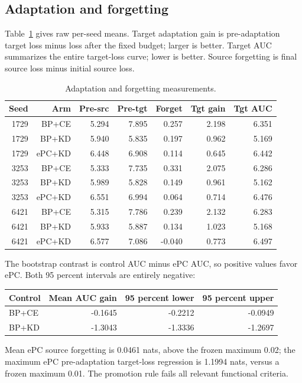 \documentclass[11pt]{article}
\begin{document}
\subsection{Adaptation and forgetting}
Table~\ref{tab:adapt} gives raw per-seed means. Target adaptation gain is pre-adaptation target loss minus loss after the fixed budget; larger is better. Target AUC summarizes the entire target-loss curve; lower is better. Source forgetting is final source loss minus initial source loss.
\begin{table}[ht]
\centering
\small
\caption{Adaptation and forgetting measurements.}
\label{tab:adapt}
\begin{tabular}{rrrrrrr}
\toprule
Seed & Arm & Pre-src & Pre-tgt & Forget & Tgt gain & Tgt AUC \\
\midrule
1729 & BP+CE  & 5.294 & 7.895 & 0.257 & 2.198 & 6.351 \\
1729 & BP+KD  & 5.940 & 5.835 & 0.197 & 0.962 & 5.169 \\
1729 & ePC+KD & 6.448 & 6.908 & 0.114 & 0.645 & 6.442 \\
3253 & BP+CE  & 5.333 & 7.735 & 0.331 & 2.075 & 6.286 \\
3253 & BP+KD  & 5.989 & 5.828 & 0.149 & 0.961 & 5.162 \\
3253 & ePC+KD & 6.551 & 6.994 & 0.064 & 0.714 & 6.476 \\
6421 & BP+CE  & 5.315 & 7.786 & 0.239 & 2.132 & 6.283 \\
6421 & BP+KD  & 5.933 & 5.887 & 0.134 & 1.023 & 5.168 \\
6421 & ePC+KD & 6.577 & 7.086 & -0.040 & 0.773 & 6.497 \\
\bottomrule
\end{tabular}
\end{table}

The bootstrap contrast is control AUC minus ePC AUC, so positive values favor ePC. Both 95 percent intervals are entirely negative:
\begin{center}
\begin{tabular}{lrrr}
\toprule
Control & Mean AUC gain & 95 percent lower & 95 percent upper \\
\midrule
BP+CE & -0.1645 & -0.2212 & -0.0949 \\
BP+KD & -1.3043 & -1.3336 & -1.2697 \\
\bottomrule
\end{tabular}
\end{center}
Mean ePC source forgetting is 0.0461 nats, above the frozen maximum 0.02; the maximum ePC pre-adaptation target-loss regression is 1.1994 nats, versus a frozen maximum 0.01. The promotion rule fails all relevant functional criteria.
\end{document}
